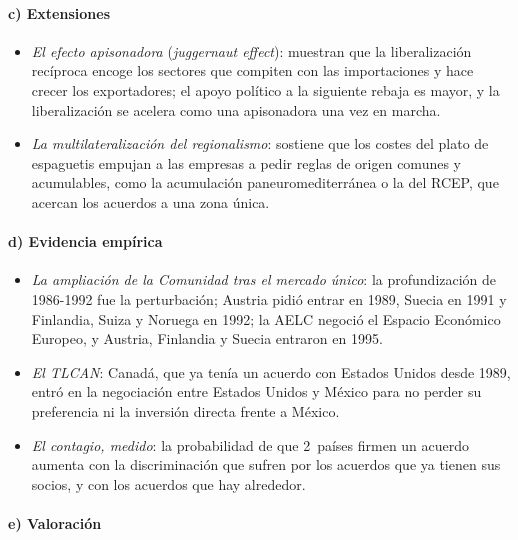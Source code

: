 \documentclass[11pt]{article}
\begin{document}
\paragraph{c) Extensiones}

\begin{itemize}
\item \emph{El efecto apisonadora} (\emph{juggernaut effect}): \textcite{BaldwinRobertNicoud2015} muestran que la liberalización recíproca encoge los sectores que compiten con las importaciones y hace crecer los exportadores; el apoyo político a la siguiente rebaja es mayor, y la liberalización se acelera como una apisonadora una vez en marcha.
\item \emph{La multilateralización del regionalismo}: \textcite{Baldwin2006Multilateralising} sostiene que los costes del plato de espaguetis empujan a las empresas a pedir reglas de origen comunes y acumulables, como la acumulación paneuromediterránea o la del RCEP, que acercan los acuerdos a una zona única.
\end{itemize}

\paragraph{d) Evidencia empírica}

\begin{itemize}
\item \emph{La ampliación de la Comunidad tras el mercado único}: la profundización de 1986-1992 fue la perturbación; Austria pidió entrar en 1989, Suecia en 1991 y Finlandia, Suiza y Noruega en 1992; la AELC negoció el Espacio Económico Europeo, y Austria, Finlandia y Suecia entraron en 1995\nocite{Baldwin1995Domino}.
\item \emph{El TLCAN}: Canadá, que ya tenía un acuerdo con Estados Unidos desde 1989, entró en la negociación entre Estados Unidos y México para no perder su preferencia ni la inversión directa frente a México.
\item \emph{El contagio, medido}: la probabilidad de que 2~países firmen un acuerdo aumenta con la discriminación que sufren por los acuerdos que ya tienen sus socios\nocite{BaldwinJaimovich2012}, y con los acuerdos que hay alrededor\nocite{EggerLarch2008}.
\end{itemize}

\paragraph{e) Valoración}
\end{document}
